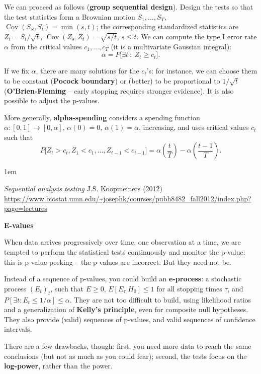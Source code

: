 \documentclass[a5paper]{article}
\DeclareMathOperator{\cov}{Cov}
\let\d\textbf
\let\leq\leqslant
\let\geq\geqslant
\newenvironment{reference}{%
  \medskip\goodbreak
  \parskip 0pt
  \raggedright
  \leftskip 1em
  \obeylines
}{\par\medskip\goodbreak}
\def\subsection#1{{\par\bigskip\goodbreak\large\bfseries #1\par}}
\begin{document}
We can proceed as follows (\d{group sequential design}).
Design the tests so that the test statistics
form a Brownian motion $S_1,\dots,S_T$,
$\cov( S_S, S_t ) = \min(s,t)$; 
the corresponding standardized statistics are
$Z_t = S_t / \sqrt t$,
$\cov(Z_s,Z_t) = \sqrt{s/t}$, $s\leq t$.
We can compute the type I error rate $\alpha$
from the critical values $c_1,\dots,c_T$
(it is a multivariate Gaussian integral):
\[ \alpha = P \bigl[ \exists t \ :\ Z_t \geq c_t \bigr]. \]

If we fix $\alpha$, there are many solutions for the $c_t$'s:
for instance, we can choose them to be constant (\d{Pocock boundary})
or (better) to be proportional to $1/\sqrt t$ (\d{O'Brien-Fleming} --
early stopping requires stronger evidence).
It is also possible to adjust the p-values.

More generally, \d{alpha-spending} considers a spending function
$\alpha: [0,1]\to[0,\alpha]$,
$\alpha(0)=0$, $\alpha(1)=\alpha$, increasing,
and uses critical values $c_t$ such that
\[
  P\bigl[ Z_t\!>\!c_t, Z_1\!<\!c_1, \dots,Z_{t-1}\!<\!c_{t-1} \bigr] =
  \alpha\left( \dfrac tT \right)
  -
  \alpha\left( \dfrac{t-1}{T} \right).
\]

\begin{reference}
  \emph{Sequential analysis testing}
  J.S. Koopmeiners (2012)
  \url{https://www.biostat.umn.edu/~josephk/courses/pubh8482_fall2012/index.php?page=lectures}
\end{reference}

\subsection{E-values}

When data arrives progressively over time, one observation at a time,
we are tempted to perform the statistical tests continuously and monitor the p-value:
this is p-value peeking -- the p-values are incorrect.
But they need not be.

Instead of a sequence of p-values, you could build an \d{e-process}:
a stochastic process $(E_t)_t$, such that
$E\geq0$,
$E[ E_\tau | H_0 ] \leq 1$ for all stopping times $\tau$,
and $P[\exists t : E_t \leq 1 / \alpha ] \leq \alpha$.
They are not too difficult to build, using likelihood ratios
and a generalization of \d{Kelly's principle},
even for composite null hypotheses.
They also provide (valid) sequences of p-values, and valid sequences of confidence intervals.

There are a few drawbacks, though:
first, you need more data to reach the same conclusions (but not as much as you could fear);
second, the tests focus on the \d{log-power}, rather than the power.
\end{document}
